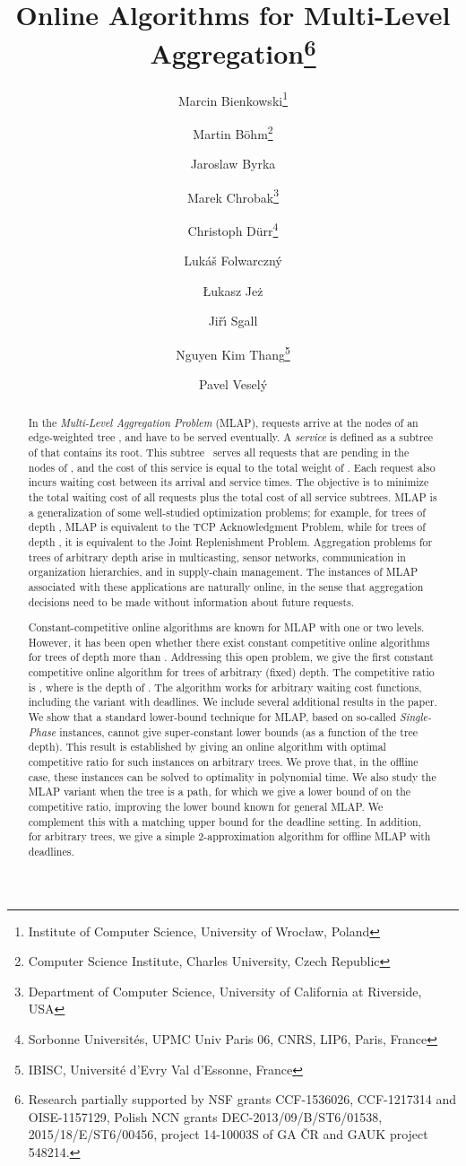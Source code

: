 \documentclass[a4paper]{article}
\title{Online Algorithms for Multi-Level Aggregation\thanks{Research partially supported by NSF grants CCF-1536026, CCF-1217314 and OISE-1157129,
	Polish NCN grants DEC-2013/09/B/ST6/01538, 2015/18/E/ST6/00456,
	project 14-10003S of GA \v{C}R and GAUK project 548214.
}}
\author{Marcin Bienkowski\thanks{Institute of Computer Science, University of Wroc{\l}aw, Poland}
\and
Martin B\"{o}hm\thanks{Computer Science Institute, Charles University, Czech Republic}
\and
Jaroslaw Byrka\footnotemark[2]
\and
Marek Chrobak\thanks{Department of Computer Science, University of California at
  Riverside, USA}
\and
Christoph D\"{u}rr\thanks{Sorbonne Universit\'{e}s, UPMC Univ Paris 06, CNRS, LIP6, Paris, France}
\and
Luk\'{a}\v{s} Folwarczn\'{y}\footnotemark[3]
\and
{\L}ukasz Je\.{z}\footnotemark[2]
\and
Ji\v{r}\'{\i} Sgall\footnotemark[3]
\and
Nguyen Kim Thang\thanks{IBISC, Universit\'{e} d'Evry Val d'Essonne, France}
\and
Pavel Vesel\'{y}\footnotemark[3]}
\newcommand{\MLAP}{\mbox{\rm\textsf{MLAP}}}
\begin{document}
\maketitle


\begin{abstract}
In the \emph{Multi-Level Aggregation Problem} ({\MLAP}), requests arrive at
the nodes of an edge-weighted tree , and have to be served 
eventually.  A \emph{service} is defined as a subtree  of  that 
contains its root. This subtree~ serves all
requests that are pending in the nodes of , and the cost of this service is
equal to the total weight of . Each request also incurs waiting cost
between its arrival and service times. The objective is to minimize the total
waiting cost of all requests plus the total cost of all service subtrees.
{\MLAP} is a generalization of some well-studied optimization problems; for
example, for trees of depth , {\MLAP} is equivalent to the TCP
Acknowledgment Problem, while for trees of depth , it is equivalent to the
Joint Replenishment Problem. Aggregation problems for trees of arbitrary depth
arise in multicasting, sensor networks, communication in organization
hierarchies, and in supply-chain management. The instances of {\MLAP}
associated with these applications are naturally online, in the sense that
aggregation decisions need to be made without information about future
requests.

Constant-competitive online algorithms are known for {\MLAP} with one or two
levels. However, it has been open whether there exist constant competitive
online algorithms for trees of depth more than .  Addressing this open
problem, we give the first constant competitive online algorithm for trees
of arbitrary (fixed) depth. The competitive ratio is ,
where  is the depth of . The algorithm works for arbitrary waiting
cost functions, including the variant with deadlines.
We include several additional results in the paper. We show that a standard
lower-bound technique for {\MLAP}, based on so-called \emph{Single-Phase}
instances, cannot give super-constant lower bounds (as a function of the tree
depth). This result is established by giving an online algorithm with optimal
competitive ratio  for such instances on arbitrary trees. 
We prove that, in the offline case, these instances can be solved to
optimality in polynomial time.
We also study the {\MLAP} variant when the tree is a path, for which we give
a lower bound of  on the competitive ratio, improving the lower bound known 
for general {\MLAP}.  We complement this with a matching upper bound for the 
deadline setting. 
In addition, for arbitrary trees,
we give a simple 2-approximation algorithm for offline {\MLAP} 
with deadlines.
\end{abstract}
\end{document}
